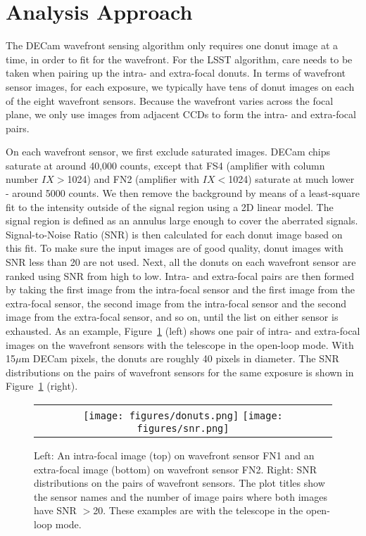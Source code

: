 \documentclass[]{spie}  %
\begin{document}
\section{Analysis Approach}
\label{sec:approach}

The DECam wavefront sensing algorithm only requires one donut image at a time, in order to fit for the wavefront. For the LSST algorithm, care needs to be taken when pairing up the intra- and extra-focal donuts.
In terms of wavefront sensor images, for each exposure, we typically have tens of donut images on each of the eight wavefront sensors. Because the wavefront varies across the focal plane, we only use images from adjacent CCDs to form the intra- and extra-focal pairs.

On each wavefront sensor, we first exclude saturated images.
DECam chips saturate at around 40,000 counts,
except that FS4 (amplifier with column number  $IX>$1024) and FN2 (amplifier with $IX<$1024) saturate at much lower - around 5000 counts.
We then remove 
the background by means of a least-square fit to the intensity outside of the signal region using a 2D linear model. The signal region is defined as an annulus large enough to cover the aberrated signals.
Signal-to-Noise Ratio (SNR) is then calculated for each donut image based on this fit.
To make sure the input images are of good quality, donut images with SNR less than 20 are not used.
Next, all the donuts on each wavefront sensor are ranked using SNR from high to low.
Intra- and extra-focal pairs are then formed by taking the first image from the intra-focal sensor and the first image from the extra-focal sensor, the second image from the intra-focal sensor and the second image from the extra-focal sensor, and so on, until the list on either sensor is exhausted.
As an example, Figure~\ref{fig:approach} (left) shows one pair of intra- and extra-focal images on the wavefront sensors with the telescope in the open-loop mode. 
With 15$\mu$m DECam pixels, the donuts are roughly 40 pixels in diameter.
The SNR distributions on the pairs of wavefront sensors for the same exposure is shown in Figure~\ref{fig:approach} (right).


   \begin{figure} [tphb]
   \begin{center}
   \begin{tabular}{c} %
   \texttt{[image: figures/donuts.png]}
   \texttt{[image: figures/snr.png]}
   \end{tabular}
   \end{center}
   \caption[example] 
   { \label{fig:approach} 
Left: An intra-focal image (top) on wavefront sensor FN1 and an 
extra-focal image (bottom) on wavefront sensor FN2.
Right: SNR distributions on the pairs of wavefront sensors. The plot titles show the sensor names and the number of image pairs where both images have SNR $>$20.
These examples are with the telescope in the open-loop mode.
}
   \end{figure} 
\end{document}
